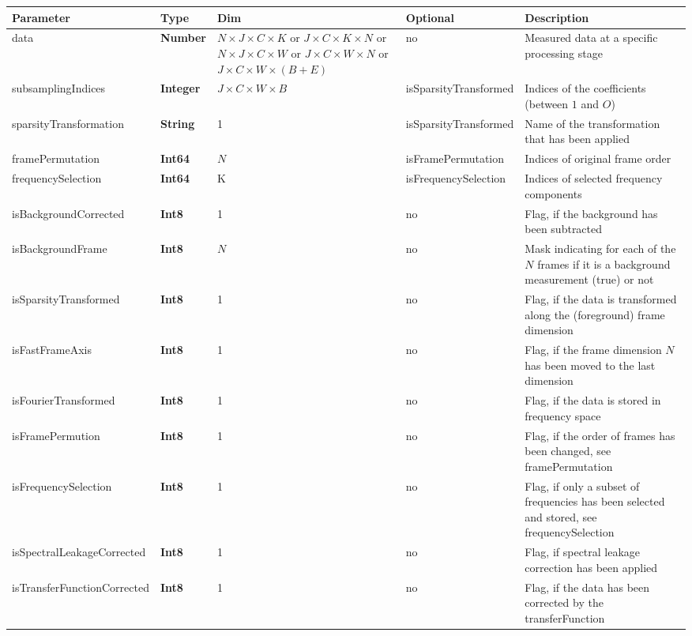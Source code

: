 \documentclass[landscape,a4paper]{article} %
\newcommand{\inltab}[1]{{\ttfamily\bfseries\color{blue}#1}}
\newcommand{\inlvar}[1]{{\ttfamily#1}}
\begin{document}
\noindent \begin{tabularx}{\columnwidth}{llp{3cm}lX} 
\textbf{Parameter} & \textbf{Type} & \textbf{Dim} &  \textbf{Optional} & \textbf{Description} \\ \hline 
\inlvar{data} & \inltab{Number} & $N \times J \times C \times K$ or $ J \times C \times K\times N$ or $N \times J \times C \times W$ or $ J \times C \times W \times N$ or $J \times C \times W \times (B+E)$ & no & Measured data at a specific processing stage \\ \hline
\inlvar{subsamplingIndices} & \inltab{Integer} & $ J \times C \times W \times B$ & \inlvar{isSparsityTransformed} & Indices of the coefficients (between $1$ and $O$)\\ \hline
\inlvar{sparsityTransformation} & \inltab{String} & 1 & \inlvar{isSparsityTransformed} & Name of the transformation that has been applied\\ \hline
\inlvar{framePermutation} & \inltab{Int64} & $N$ & \inlvar{isFramePermutation} & Indices of original frame order\\ \hline
\inlvar{frequencySelection} & \inltab{Int64} & K & \inlvar{isFrequencySelection} & Indices of selected frequency components \\ \hline
\inlvar{isBackgroundCorrected} & \inltab{Int8} & 1 & no & Flag, if the background has been subtracted \\ \hline
\inlvar{isBackgroundFrame} & \inltab{Int8} & $N$ & no & Mask indicating for each of the $N$ frames if it is a background measurement (true) or not \\ \hline
\inlvar{isSparsityTransformed} & \inltab{Int8} & 1 & no & Flag, if the data is transformed along the (foreground) frame dimension \\ \hline
\inlvar{isFastFrameAxis} & \inltab{Int8} & 1 & no & Flag, if the frame dimension $N$ has been moved to the last dimension\\ \hline
\inlvar{isFourierTransformed} & \inltab{Int8} & 1 & no & Flag, if the data is stored in frequency space \\ \hline
\inlvar{isFramePermution} & \inltab{Int8} & 1 & no & Flag, if the order of frames has been changed, see \inlvar{framePermutation} \\ \hline 
\inlvar{isFrequencySelection} & \inltab{Int8} & 1 & no & Flag, if only a subset of frequencies has been selected and stored, see \inlvar{frequencySelection}\\ \hline 
\inlvar{isSpectralLeakageCorrected} & \inltab{Int8} & 1 & no & Flag, if spectral leakage correction has been applied \\ \hline
\inlvar{isTransferFunctionCorrected} & \inltab{Int8} & 1 & no & Flag, if the data has been corrected by the \inlvar{transferFunction}\\ \hline 
\end{tabularx} 
\end{document}
